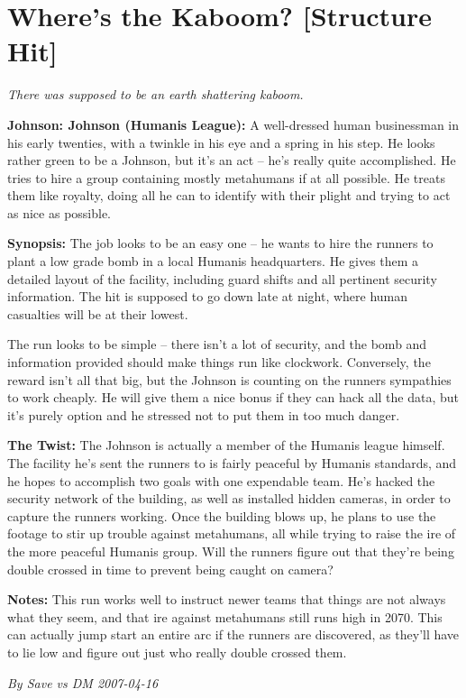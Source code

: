 \documentclass[letterpaper,twocolumn,10.5pt]{article}
\newenvironment{scenario}[6]
	{
		\section{#1 {\small[#2]}}
		\textit{#3}
		\def\TMPSCENARIO{#4 #5}
	}
	{\small\textit{By \TMPSCENARIO}}
\newcommand{\johnson}[2]{\textbf{Johnson: #1 (#2):}}
\newcommand{\synopsis}{\textbf{Synopsis: }}
\newcommand{\notes}{\textbf{Notes: }}
\newcommand{\twist}{\textbf{The Twist: }}
\begin{document}
\begin{scenario}{Where’s the Kaboom?}
	{Structure Hit}
	{ There was supposed to be an earth shattering kaboom.}
	{Save vs DM}
	{2007-04-16}
	{https://forum.rpg.net/showthread.php?321504-Shadowrun-4th-101-Instant-Scenarios\&p=7174787#post7174787}

\johnson{Johnson}{Humanis League} A well-dressed human businessman in his early twenties, with a twinkle in his eye and a spring in his step. He looks rather green to be a Johnson, but it’s an act – he’s really quite accomplished. He tries to hire a group containing mostly metahumans if at all possible. He treats them like royalty, doing all he can to identify with their plight and trying to act as nice as possible.

\synopsis The job looks to be an easy one – he wants to hire the runners to plant a low grade bomb in a local Humanis headquarters. He gives them a detailed layout of the facility, including guard shifts and all pertinent security information. The hit is supposed to go down late at night, where human casualties will be at their lowest.

The run looks to be simple – there isn’t a lot of security, and the bomb and information provided should make things run like clockwork. Conversely, the reward isn’t all that big, but the Johnson is counting on the runners sympathies to work cheaply. He will give them a nice bonus if they can hack all the data, but it’s purely option and he stressed not to put them in too much danger.

\twist The Johnson is actually a member of the Humanis league himself. The facility he’s sent the runners to is fairly peaceful by Humanis standards, and he hopes to accomplish two goals with one expendable team. He’s hacked the security network of the building, as well as installed hidden cameras, in order to capture the runners working. Once the building blows up, he plans to use the footage to stir up trouble against metahumans, all while trying to raise the ire of the more peaceful Humanis group. Will the runners figure out that they’re being double crossed in time to prevent being caught on camera?

\notes This run works well to instruct newer teams that things are not always what they seem, and that ire against metahumans still runs high in 2070. This can actually jump start an entire arc if the runners are discovered, as they’ll have to lie low and figure out just who really double crossed them.

\end{scenario}
\end{document}
